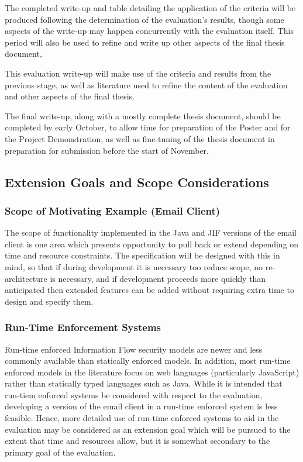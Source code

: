 The completed write-up and table detailing the application of the criteria will be produced following the determination of the evaluation's results, though some aspects of the write-up may happen concurrently with the evaluation itself. This period will also be used to refine and write up other aspects of the final thesis document,

This evaluation write-up will make use of the criteria and results from the previous stage, as well as literature used to refine the content of the evaluation and other aspects of the final thesis.

The final write-up, along with a mostly complete thesis document, should be completed by early October, to allow time for preparation of the Poster and for the Project Demonstration, as well as fine-tuning of the thesis document in preparation for submission before the start of November.

\pagebreak

\subsection{Extension Goals and Scope Considerations}
	
	\subsubsection{Scope of Motivating Example (Email Client)}
	
	The scope of functionality implemented in the Java and JIF versions of the email client is one area which presents opportunity to pull back or extend depending on time and resource constraints. The specification will be designed with this in mind, so that if during development it is necessary too reduce scope, no re-architecture is necessary, and if development proceeds more quickly than anticipated then extended features can be added without requiring extra time to design and specify them.
	
	\subsubsection{Run-Time Enforcement Systems}
	
	Run-time enforced Information Flow security models are newer and less commonly available than statically enforced models. In addition, most run-time enforced models in the literature focus on web languages (particularly JavaScript) rather than statically typed languages such as Java. While it is intended that run-tiem enforced systems be considered with respect to the evaluation, developing a version of the email client in a run-time enforced system is less feasible. Hence, more detailed use of run-time enforced systems to aid in the evaluation may be considered as an extension goal which will be pursued to the extent that time and resources allow, but it is somewhat secondary to the primary goal of the evaluation.
	
